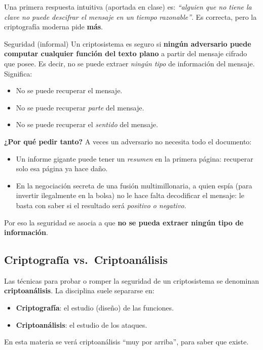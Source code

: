 \documentclass[11pt,a4paper]{article}
\begin{document}
Una primera respuesta intuitiva (aportada en clase) es: \emph{``alguien que no tiene la clave
no puede descifrar el mensaje en un tiempo razonable''}. Es correcta, pero la criptografía
moderna pide \textbf{más}.

\begin{defbox}{Seguridad (informal)}
Un criptosistema es seguro si \textbf{ningún adversario puede computar cualquier función del
texto plano} a partir del mensaje cifrado que posee. Es decir, no se puede extraer
\emph{ningún tipo} de información del mensaje. Significa:
\begin{itemize}[leftmargin=1.4em,itemsep=1pt]
  \item No se puede recuperar el mensaje.
  \item No se puede recuperar \emph{parte} del mensaje.
  \item No se puede recuperar el \emph{sentido} del mensaje.
\end{itemize}
\end{defbox}

\begin{notebox}
\textbf{¿Por qué pedir tanto?} A veces un adversario no necesita todo el documento:
\begin{itemize}[leftmargin=1.3em,itemsep=1pt]
  \item Un informe gigante puede tener un \emph{resumen} en la primera página: recuperar solo
        esa página ya hace daño.
  \item En la negociación secreta de una fusión multimillonaria, a quien espía (para invertir
        ilegalmente en la bolsa) no le hace falta decodificar el mensaje: le basta con saber
        si el resultado será \emph{positivo o negativo}.
\end{itemize}
Por eso la seguridad se asocia a que \textbf{no se pueda extraer ningún tipo de información}.
\end{notebox}

\subsection{Criptografía vs.\ Criptoanálisis}
\begin{notebox}
Las técnicas para probar o romper la seguridad de un criptosistema se denominan
\textbf{criptoanálisis}. La disciplina suele separarse en:
\begin{itemize}[leftmargin=1.3em,itemsep=1pt]
  \item \textbf{Criptografía}: el estudio (diseño) de las funciones.
  \item \textbf{Criptoanálisis}: el estudio de los ataques.
\end{itemize}
En esta materia se verá criptoanálisis ``muy por arriba'', para saber que existe.
\end{notebox}
\end{document}
